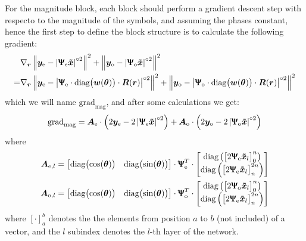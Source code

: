 For the magnitude block, each block should perform a gradient descent step with respecto to the magnitude of the symbols, and assuming the phases constant, hence the first step to define the block structure is to calculate the following gradient:
 \begin{align}
	&\nabla_{\bm r}\left\lVert \bm y_\text{e} - \left|\bm{\Uppsi_\text{e}\tilde{x} } \right|^{\circ2}\right\rVert^2+\left\lVert \bm y_\text{o} - \left|\bm{\Uppsi_\text{o}\tilde{x} } \right|^{\circ2}\right\rVert^2\\
	=&\nabla_{\bm r}\left\lVert \bm y_\text{e} - \left|\bm{\Uppsi}_\text{e}\cdot\text{diag}\bigl(\bm w(\bm\theta)\bigr)\cdot\bm R(\bm r)  \right|^{\circ2}\right\rVert^2+\left\lVert \bm y_\text{o} - \left|\bm{\Uppsi}_\text{o}\cdot\text{diag}\bigl(\bm w(\bm\theta)\bigr)\cdot\bm R(\bm r)  \right|^{\circ2}\right\rVert^2
\end{align}
which we will name $\text{grad}_\text{mag}$, and after some calculations we get:
\begin{equation}
\text{grad}_\text{mag}=\bm A_\text{e}\cdot\left(2\bm y_\text{e} - 2\left|\bm{\Uppsi}_\text{e}\bm{\tilde{x}}\right|^{\circ2}\right)+
\bm A_\text{o}\cdot\left(2\bm y_\text{o} - 2\left|\bm{\Uppsi}_\text{o}\bm{\tilde{x}}\right|^{\circ2}\right)
\label{eq:grad_mag}
\end{equation}
where
\begin{align}
\bm A_{\text{e},l}&=\begin{bmatrix}\text{diag}\bigl(\cos(\bm\theta)\bigr)&\text{diag}\bigl(\sin(\bm\theta)\bigr)\end{bmatrix}\cdot\bm\Uppsi_\text{e}^T\cdot\begin{bmatrix}\text{diag}\left(\bigl[2\bm{\Uppsi}_\text{e}\bm{\tilde{x}}_l\bigr]_0^n\right)\\\text{diag}\left(\bigl[2\bm{\Uppsi}_\text{e}\bm{\tilde{x}}_l \bigr]_{n}^{2n}\right)\end{bmatrix}\\
\bm A_{\text{o},l}&=\begin{bmatrix}\text{diag}\bigl(\cos(\bm\theta)\bigr)&\text{diag}\bigl(\sin(\bm\theta)\bigr)\end{bmatrix}\cdot\bm\Uppsi_\text{o}^T\cdot\begin{bmatrix}\text{diag}\left(\bigl[2\bm{\Uppsi}_\text{o}\bm{\tilde{x}}_l\bigr]_0^n\right)\\\text{diag}\left(\bigl[2\bm{\Uppsi}_\text{e}\bm{\tilde{x}}_l\bigr]_{n}^{2n}\right)\end{bmatrix}
\end{align}
where $[\cdot]_a^b$ denotes the the elements from position $a$ to $b$ (not included) of a vector, and the $l$ subindex denotes the $l$-th layer of the network.\\

